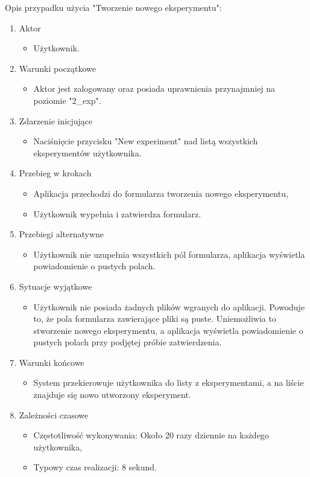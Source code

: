 Opis przypadku użycia "Tworzenie nowego eksperymentu":
\begin{enumerate}
\item  Aktor
	\begin{itemize}
		\item Użytkownik. 
	\end{itemize}
\item Warunki początkowe
	\begin{itemize}
		\item Aktor jest zalogowany oraz posiada uprawnienia przynajmniej na poziomie "2\_exp".
	\end{itemize}
\item Zdarzenie inicjujące
	\begin{itemize}
		\item Naciśnięcie przycisku "New experiment" nad listą wszystkich eksperymentów użytkownika.
	\end{itemize}
\item Przebieg w krokach
	\begin{itemize}
		\item Aplikacja przechodzi do formularza tworzenia nowego eksperymentu,
		\item Użytkownik wypełnia i zatwierdza formularz.
	\end{itemize}
\item Przebiegi alternatywne
	\begin{itemize}
		\item  Użytkownik nie uzupełnia wszystkich pól formularza, aplikacja wyświetla powiadomienie o pustych polach.
	\end{itemize}
\item Sytuacje wyjątkowe
	\begin{itemize}
		\item  Użytkownik nie posiada żadnych plików wgranych do aplikacji. Powoduje to, że pola formularza zawierające pliki są puste. Uniemożliwia to stworzenie nowego eksperymentu, a aplikacja wyświetla powiadomienie o pustych polach przy podjętej próbie zatwierdzenia.
	\end{itemize}
\item Warunki końcowe
	\begin{itemize}
		\item  System przekierowuje użytkownika do listy z eksperymentami, a na liście znajduje się nowo utworzony eksperyment.
	\end{itemize}
\item Zależności czasowe
	\begin{itemize}
		\item  Częstotliwość wykonywania: Około 20 razy dziennie na każdego użytkownika,
		\item Typowy czas realizacji: 8 sekund.
	\end{itemize}
\end{enumerate}

